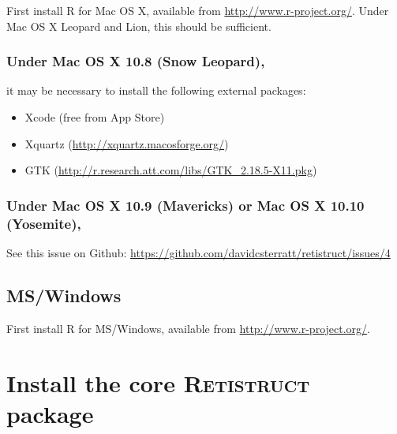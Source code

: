 \documentclass{book}
\begin{document}
First install R for Mac OS X, available from
\url{http://www.r-project.org/}. Under Mac OS X Leopard and Lion, this
should be sufficient. 

\subsubsection{Under Mac OS X 10.8 (Snow Leopard),} it may be necessary to
install the following external packages:
\begin{itemize}
\item Xcode (free from App Store)
\item Xquartz (\href{http://xquartz.macosforge.org/}{http://xquartz.macosforge.org/})
\item GTK (\href{http://r.research.att.com/libs/GTK_2.18.5-X11.pkg}{http://r.research.att.com/libs/GTK\_2.18.5-X11.pkg})
\end{itemize}

\subsubsection{Under Mac OS X 10.9 (Mavericks) or Mac OS X 10.10
  (Yosemite),}
See this issue on Github: \url{https://github.com/davidcsterratt/retistruct/issues/4}

\subsection{MS/Windows}

First install R for MS/Windows, available from \url{http://www.r-project.org/}.

\section{Install the core \textsc{Retistruct} package}
\end{document}
